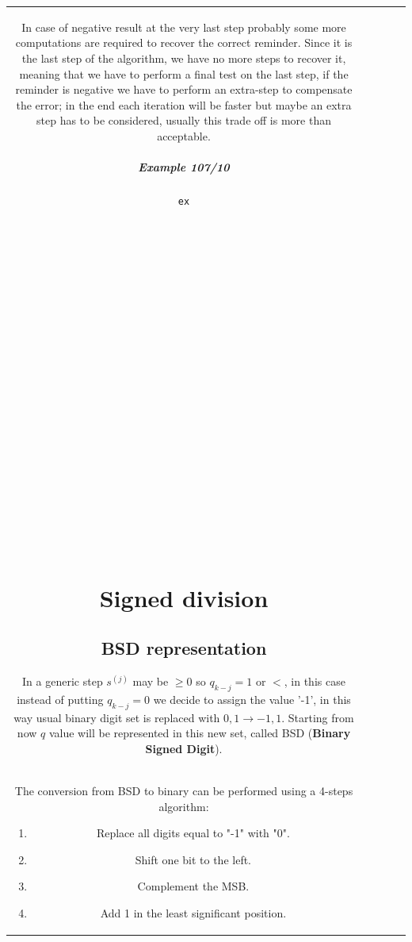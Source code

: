 \begin{center}
\begin{tabular}{|c|c|c|c|c|}
In case of negative result at the very last step probably some more computations are required to recover the correct reminder. Since it is the last step of the algorithm, we have no more steps to recover it, meaning that we have to perform a final test on the last step, if the reminder is negative we have to perform an extra-step to compensate the error; in the end each iteration will be faster but maybe an extra step has to be considered, usually this trade off is more than acceptable.

\subparagraph{Example 107/10}

\begin{verbatim}
ex























\end{verbatim}

\section{Signed division}

\subsection{BSD representation}
In a generic step $s^{(j)}$ may be $\geq 0$ so  $q_{k-j}=1$ or $<$, in this case instead of putting $q_{k-j}=0$ we decide to assign the value '-1', in this way usual binary digit set is replaced with ${0,1} \rightarrow {-1, 1}$. Starting from now $q$ value will be represented in this new set, called BSD (\textbf{Binary Signed Digit}).\\

The conversion from BSD to binary can be performed using a 4-steps algorithm:
\begin{enumerate}
  \item Replace all digits equal to "-1" with "0".
  \item Shift one bit to the left.
  \item Complement the MSB.
  \item Add 1 in the least significant position.
\end{enumerate}


\end{tabular}
\end{center}
